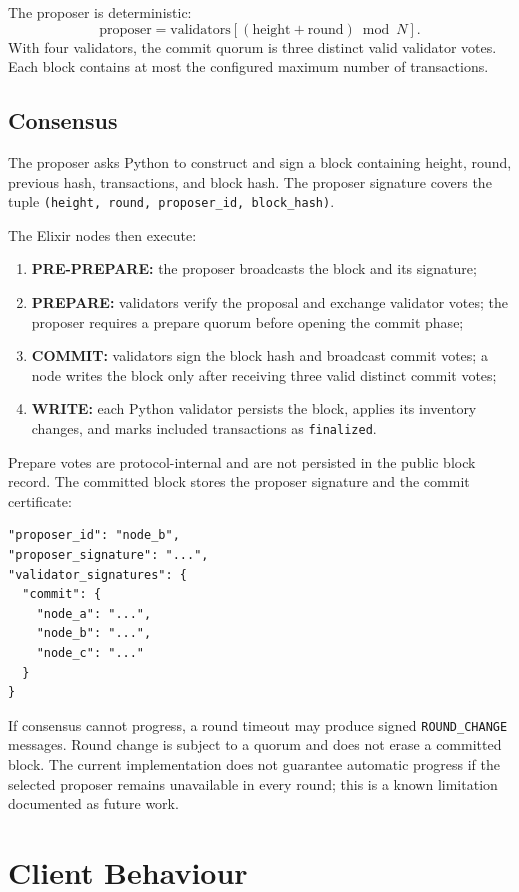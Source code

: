 \documentclass[11pt,a4paper]{memoir}
\begin{document}
The proposer is deterministic:
\[
  \mathrm{proposer} = \mathrm{validators}[
  (\mathrm{height}+\mathrm{round}) \bmod N].
\]
With four validators, the commit quorum is three distinct valid validator
votes. Each block contains at most the configured maximum number of
transactions.

\section{Consensus}
The proposer asks Python to construct and sign a block containing height,
round, previous hash, transactions, and block hash. The proposer signature
covers the tuple \texttt{(height, round, proposer\_id, block\_hash)}.

The Elixir nodes then execute:
\begin{enumerate}
  \item \textbf{PRE-PREPARE:} the proposer broadcasts the block and its
        signature;
  \item \textbf{PREPARE:} validators verify the proposal and exchange
        validator votes; the proposer requires a prepare quorum before
        opening the commit phase;
  \item \textbf{COMMIT:} validators sign the block hash and broadcast commit
        votes; a node writes the block only after receiving three valid
        distinct commit votes;
  \item \textbf{WRITE:} each Python validator persists the block, applies its
        inventory changes, and marks included transactions as
        \texttt{finalized}.
\end{enumerate}

Prepare votes are protocol-internal and are not persisted in the public block
record. The committed block stores the proposer signature and the commit
certificate:
\begin{lstlisting}
"proposer_id": "node_b",
"proposer_signature": "...",
"validator_signatures": {
  "commit": {
    "node_a": "...",
    "node_b": "...",
    "node_c": "..."
  }
}
\end{lstlisting}

If consensus cannot progress, a round timeout may produce signed
\texttt{ROUND\_CHANGE} messages. Round change is subject to a quorum and does
not erase a committed block. The current implementation does not guarantee
automatic progress if the selected proposer remains unavailable in every
round; this is a known limitation documented as future work.

\chapter{Client Behaviour}
\end{document}
